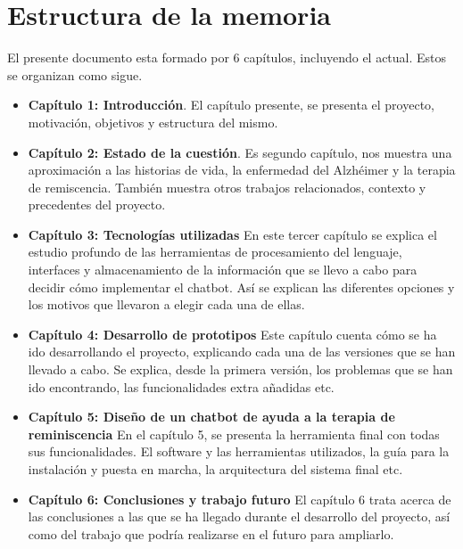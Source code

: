 \section{Estructura de la memoria}
El presente documento esta formado por 6  capítulos, incluyendo el actual. Estos se organizan como sigue. 
\begin{itemize}
	\item \textbf{Capítulo 1: Introducción}. El capítulo presente, se presenta el proyecto, motivación, objetivos y estructura del mismo. 
	\item \textbf{Capítulo 2: Estado de la cuestión}. Es segundo capítulo, nos muestra una aproximación a las historias de vida, la enfermedad del Alzhéimer y la terapia de remiscencia. También muestra otros trabajos relacionados, contexto y precedentes del proyecto. 
	\item \textbf{Capítulo 3: Tecnologías utilizadas} En este tercer capítulo se explica el estudio profundo de las herramientas de procesamiento del lenguaje, interfaces y almacenamiento de la información que se llevo a cabo para decidir cómo implementar el chatbot. Así se explican las diferentes opciones y los motivos que llevaron a elegir cada una de ellas. 
	\item \textbf{Capítulo 4: Desarrollo de prototipos}
	Este capítulo cuenta cómo se ha ido desarrollando el proyecto, explicando cada una de las versiones que se han llevado a cabo. Se explica, desde la primera versión, los problemas que se han ido encontrando, las funcionalidades extra añadidas etc. 
	\item \textbf{Capítulo 5: Diseño de un chatbot de ayuda a la terapia de reminiscencia}
	En el capítulo 5, se presenta la herramienta final con todas sus funcionalidades. El software y las herramientas utilizados, la guía para la instalación y puesta en marcha, la arquitectura del sistema final etc. 
	\item \textbf{Capítulo 6: Conclusiones y trabajo futuro}
	El capítulo 6 trata acerca de las conclusiones a las que se ha llegado durante el desarrollo del proyecto, así como del trabajo que podría realizarse en el futuro para ampliarlo.
	
\end{itemize}



